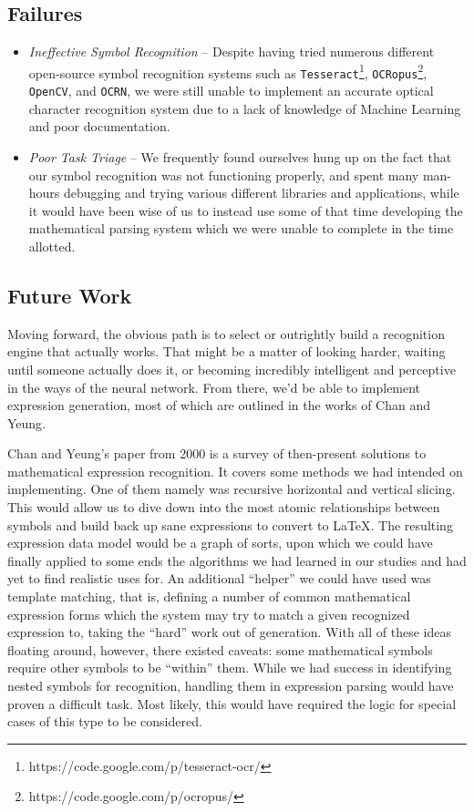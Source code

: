 \documentclass{acm_proc_article-sp}
\begin{document}
\subsection{Failures}
\begin{itemize}
	\item{\emph{Ineffective Symbol Recognition}} -- Despite having tried numerous different open-source symbol recognition systems such as \texttt{Tesseract}\footnote{https://code.google.com/p/tesseract-ocr/}, \texttt{OCRopus}\footnote{https://code.google.com/p/ocropus/}, \texttt{OpenCV}, and \texttt{OCRN}, we were still unable to implement an accurate optical character recognition system due to a lack of knowledge of Machine Learning and poor documentation.
	\item{\emph{Poor Task Triage}} -- We frequently found ourselves hung up on the fact that our symbol recognition was not functioning properly, and spent many man-hours debugging and trying various different libraries and applications, while it would have been wise of us to instead use some of that time developing the mathematical parsing system which we were unable to complete in the time allotted.

	
	\end{itemize}

\subsection{Future Work}
Moving forward, the obvious path is to select or outrightly build a recognition engine that actually works. That might be a matter of looking harder, waiting until someone actually does it, or becoming incredibly intelligent and perceptive in the ways of the neural network. From there, we'd be able to implement expression generation, most of which are outlined in the works of Chan and Yeung\cite{chan_mathematical_2000}. 

Chan and Yeung's paper from 2000 is a survey of then-present solutions to mathematical expression recognition. It covers some methods we had intended on implementing. One of them namely was recursive horizontal and vertical slicing. This would allow us to dive down into the most atomic relationships between symbols and build back up sane expressions to convert to \LaTeX{}. The resulting expression data model would be a graph of sorts, upon which we could have finally applied to some ends the algorithms we had learned in our studies and had yet to find realistic uses for. An additional ``helper'' we could have used was template matching, that is, defining a number of common mathematical expression forms which the system may try to match a given recognized expression to, taking the ``hard'' work out of generation. With all of these ideas floating around, however, there existed caveats: some mathematical symbols require other symbols to be ``within'' them. While we had success in identifying nested symbols for recognition, handling them in expression parsing would have proven a difficult task. Most likely, this would have required the logic for special cases of this type to be considered.
\end{document}
